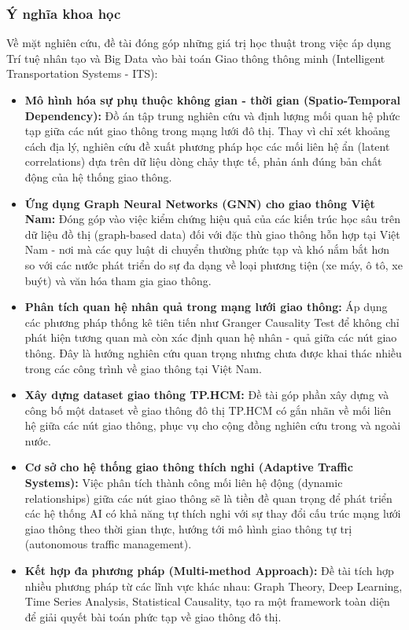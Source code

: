 \subsubsection{Ý nghĩa khoa học}
Về mặt nghiên cứu, đề tài đóng góp những giá trị học thuật trong việc áp dụng Trí tuệ nhân tạo và Big Data vào bài toán Giao thông thông minh (Intelligent Transportation Systems - ITS):

\begin{itemize}
    \item \textbf{Mô hình hóa sự phụ thuộc không gian - thời gian (Spatio-Temporal Dependency):} Đồ án tập trung nghiên cứu và định lượng mối quan hệ phức tạp giữa các nút giao thông trong mạng lưới đô thị. Thay vì chỉ xét khoảng cách địa lý, nghiên cứu đề xuất phương pháp học các mối liên hệ ẩn (latent correlations) dựa trên dữ liệu dòng chảy thực tế, phản ánh đúng bản chất động của hệ thống giao thông.
    
    \item \textbf{Ứng dụng Graph Neural Networks (GNN) cho giao thông Việt Nam:} Đóng góp vào việc kiểm chứng hiệu quả của các kiến trúc học sâu trên dữ liệu đồ thị (graph-based data) đối với đặc thù giao thông hỗn hợp tại Việt Nam - nơi mà các quy luật di chuyển thường phức tạp và khó nắm bắt hơn so với các nước phát triển do sự đa dạng về loại phương tiện (xe máy, ô tô, xe buýt) và văn hóa tham gia giao thông.
    
    \item \textbf{Phân tích quan hệ nhân quả trong mạng lưới giao thông:} Áp dụng các phương pháp thống kê tiên tiến như Granger Causality Test để không chỉ phát hiện tương quan mà còn xác định quan hệ nhân - quả giữa các nút giao thông. Đây là hướng nghiên cứu quan trọng nhưng chưa được khai thác nhiều trong các công trình về giao thông tại Việt Nam.
    
    \item \textbf{Xây dựng dataset giao thông TP.HCM:} Đề tài góp phần xây dựng và công bố một dataset về giao thông đô thị TP.HCM có gắn nhãn về mối liên hệ giữa các nút giao thông, phục vụ cho cộng đồng nghiên cứu trong và ngoài nước.
    
    \item \textbf{Cơ sở cho hệ thống giao thông thích nghi (Adaptive Traffic Systems):} Việc phân tích thành công mối liên hệ động (dynamic relationships) giữa các nút giao thông sẽ là tiền đề quan trọng để phát triển các hệ thống AI có khả năng tự thích nghi với sự thay đổi cấu trúc mạng lưới giao thông theo thời gian thực, hướng tới mô hình giao thông tự trị (autonomous traffic management).
    
    \item \textbf{Kết hợp đa phương pháp (Multi-method Approach):} Đề tài tích hợp nhiều phương pháp từ các lĩnh vực khác nhau: Graph Theory, Deep Learning, Time Series Analysis, Statistical Causality, tạo ra một framework toàn diện để giải quyết bài toán phức tạp về giao thông đô thị.
\end{itemize}

